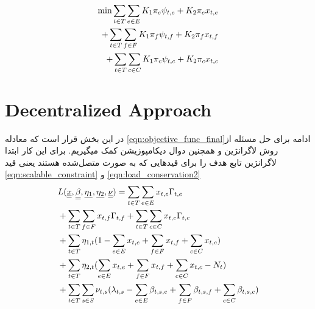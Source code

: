 	\begin{align}
		\min \sum_{t \in T}\sum_{e \in E} K_1\pi_e\psi_{t,e}+K_2\pi_ex_{t,e}\notag \\
		+\sum_{t \in T}\sum_{f \in F} K_1\pi_f\psi_{t,f}+K_2\pi_fx_{t,f}\notag \\
		+\sum_{t \in T}\sum_{c \in C} K_1\pi_c\psi_{t,c}+K_2\pi_cx_{t,c} \label{eqn:objective_func_final}	
	\end{align}
	
	\section{Decentralized Approach}
	در این بخش قرار است که معادله \cref{eqn:objective_func_final}ادامه برای حل مسئله از روش لاگرانژین و همچنین دوال دیکامپوزیشن کمک میگیریم. برای این کار ابتدا لاگرانژین تابع هدف را برای قیدهایی که به صورت متصل‌شده هستند یعنی قید \cref{eqn:scalable_constraint} و \cref{eqn:load_conservation2} 
	\begin{subequations}
		\begin{align}
		& \notag L(\underline{\underline x}, \underline{\underline \beta}, \underline {\eta_1}, \underline {\eta_2}, \underline{\underline \nu}) = \sum_{t \in T}\sum_{e \in E} x_{t,e}\Gamma_{t,e} \\
		& \notag + \sum_{t \in T}\sum_{f \in F} x_{t,f}\Gamma_{t,f} + \sum_{t \in T}\sum_{c \in C} x_{t,c}\Gamma_{t,c} \\
		& \notag + \sum_{t \in T  }{\eta_{1,t}(1-\sum_{e \in E}x_{t,e} + \sum_{f \in F}x_{t,f} + \sum_{c \in C}x_{t,c})} \\
		& \notag + \sum_{t \in T}{\eta_{2,t}(\sum_{e \in E}x_{t,e} + \sum_{f \in F}x_{t,f} + \sum_{c \in C}x_{t,c}-N_t)} \\
		& + \sum_{t \in T}\sum_{s \in S}{\nu_{t,s}(\lambda_{t,s} - \sum_{e \in E}\beta_{t,s,e} + \sum_{f \in F}\beta_{t,s,f} +\sum_{c \in C}\beta_{t,s,c})}
		\end{align}
	\end{subequations}
	
